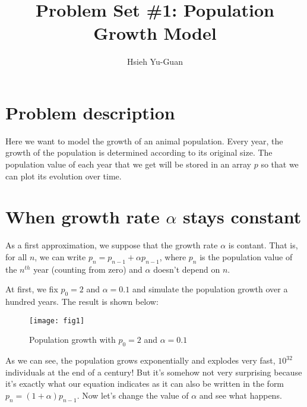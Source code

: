 

\pagestyle{fancy} 
\rfoot{\thepage}
\cfoot{}
\lfoot{~\theauthor}
\renewcommand{\headrulewidth}{0.4pt}
\renewcommand{\footrulewidth}{0.4pt}

\title{Problem Set \#1: Population Growth Model \vspace{-0.5em}}
\author{Hsieh Yu-Guan}
\date{}
\maketitle

\thispagestyle{fancy}

\section{Problem description}

Here we want to model the growth of an animal population. Every year, 
the growth of the population is determined according to its original size.
The population value of each year that we get will be stored in an array 
$p$ so that we can plot its evolution over time.

\section{When growth rate $\alpha$ stays constant}

As a first approximation, we suppose that the growth rate $\alpha$ is contant.
That is, for all $n$, we can write $p_n = p_{n-1} + \alpha p_{n-1}$, where 
$p_n$ is the population value of the $n^{th}$ year (counting from zero) and 
$\alpha$ doesn't depend on $n$.

At first, we fix $p_0 = 2$ and $\alpha = 0.1$ and simulate the population 
growth over a hundred years. The result is shown below:

\vspace{-1em}
\begin{figure}[H]
  \centering
  \texttt{[image: fig1]}
  \caption{Population growth with $p_0 = 2$ and $\alpha = 0.1$}
\end{figure}

As we can see, the population grows exponentially and explodes very fast, 
$10^{32}$ individuals at the end of a century! But it's somehow not very 
surprising because it's exactly what our equation indicates as it can also
be written in the form $p_n = (1+\alpha)p_{n-1}$. Now let's change the value 
of $\alpha$ and see what happens.

